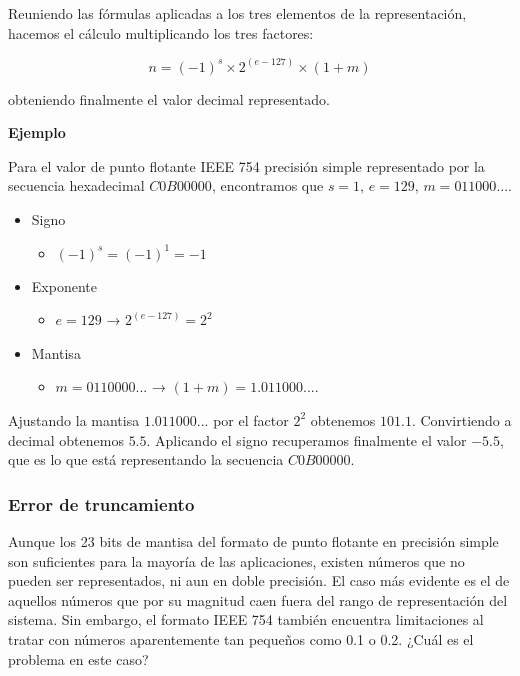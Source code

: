 \documentclass[spanish,a4paper,]{article}
\providecommand{\tightlist}{%
  \setlength{\itemsep}{0pt}\setlength{\parskip}{0pt}}
\begin{document}
Reuniendo las fórmulas aplicadas a los tres elementos de la
representación, hacemos el cálculo multiplicando los tres factores:

\[n = (-1)^s \times 2^{(e-127)}  \times (1+m)\]

obteniendo finalmente el valor decimal representado.

\textbf{Ejemplo}

Para el valor de punto flotante IEEE 754 precisión simple representado
por la secuencia hexadecimal \(C0B00000\), encontramos que \(s=1\),
\(e=129\), \(m=011000...\).

\begin{itemize}
\tightlist
\item
  Signo

  \begin{itemize}
  \tightlist
  \item
    \((-1)^s = (-1)^1 = -1\)
  \end{itemize}
\item
  Exponente

  \begin{itemize}
  \tightlist
  \item
    \(e = 129\) → \(2^{(e-127)} = 2^2\)
  \end{itemize}
\item
  Mantisa

  \begin{itemize}
  \tightlist
  \item
    \(m = 0110000...\) → \((1 + m) = 1.011000....\)
  \end{itemize}
\end{itemize}

Ajustando la mantisa \(1.011000...\) por el factor \(2^2\) obtenemos
\(101.1\). Convirtiendo a decimal obtenemos \(5.5\). Aplicando el signo
recuperamos finalmente el valor \(-5.5\), que es lo que está
representando la secuencia \(C0B00000\).

\hypertarget{error-de-truncamiento}{%
\subsubsection{Error de truncamiento}\label{error-de-truncamiento}}

Aunque los 23 bits de mantisa del formato de punto flotante en precisión
simple son suficientes para la mayoría de las aplicaciones, existen
números que no pueden ser representados, ni aun en doble precisión. El
caso más evidente es el de aquellos números que por su magnitud caen
fuera del rango de representación del sistema. Sin embargo, el formato
IEEE 754 también encuentra limitaciones al tratar con números
aparentemente tan pequeños como 0.1 o 0.2. ¿Cuál es el problema en este
caso?
\end{document}
